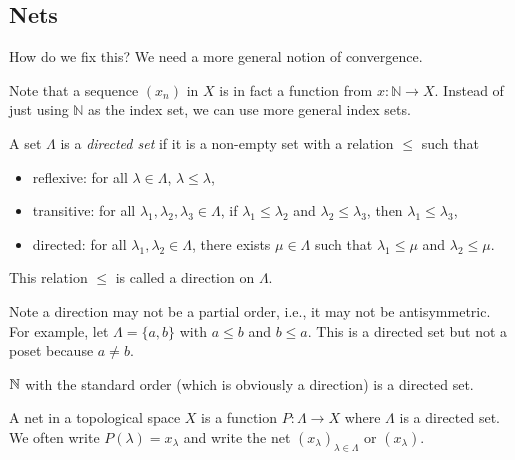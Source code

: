 \subsection{Nets}
How do we fix this? We need a more general notion of convergence.

Note that a sequence $(x_n)$ in $X$ is in fact a function from $x:\mathbb{N}\to X$. Instead of just using $\mathbb{N}$ as the index set, we can use more general index sets.

\begin{definition}
    A set $\Lambda$ is a \emph{directed set} if it is a non-empty set with a relation $\le$ such that
    \begin{itemize}
        \item reflexive: for all $\lambda\in\Lambda$, $\lambda\le \lambda$,
        \item transitive: for all $\lambda_1,\lambda_2,\lambda_3\in\Lambda$, if $\lambda_1\le \lambda_2$ and $\lambda_2\le \lambda_3$, then $\lambda_1\le \lambda_3$,
        \item directed: for all $\lambda_1,\lambda_2\in\Lambda$, there exists $\mu\in\Lambda$ such that $\lambda_1\le \mu$ and $\lambda_2\le \mu$.
    \end{itemize}
    
    
    This relation $\le$ is called a direction on $\Lambda$.
\end{definition}

\begin{remark}
    Note a direction may not be a partial order, i.e., it may not be antisymmetric. For example, let $\Lambda=\{a,b\}$ with $a\le b$ and $b\le a$. This is a directed set but not a poset because $a\neq b$.
\end{remark}

\begin{example}
    $\mathbb{N}$ with the standard order (which is obviously a direction) is a directed set.
\end{example}


\begin{definition}
    A net in a topological space $X$ is a function $P\colon \Lambda\to X$ where $\Lambda$ is a directed set. We often write $P(\lambda)=x_\lambda$ and write the net $(x_\lambda)_{\lambda\in\Lambda}$ or $(x_\lambda)$.

\end{definition}

